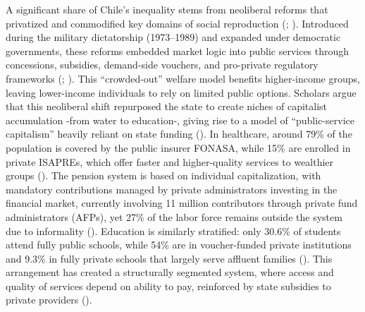 \documentclass[
  13pt,
]{article}
\begin{document}
A significant share of Chile's inequality stems from neoliberal reforms
that privatized and commodified key domains of social reproduction
(;
). Introduced during the
military dictatorship (1973--1989) and expanded under democratic
governments, these reforms embedded market logic into public services
through concessions, subsidies, demand-side vouchers, and pro-private
regulatory frameworks (;
). This
``crowded-out'' welfare model benefits higher-income groups, leaving
lower-income individuals to rely on limited public options. Scholars
argue that this neoliberal shift repurposed the state to create niches
of capitalist accumulation -from water to education-, giving rise to a
model of ``public-service capitalism'' heavily reliant on state funding
(). In healthcare, around
79\% of the population is covered by the public insurer FONASA, while
15\% are enrolled in private ISAPREs, which offer faster and
higher-quality services to wealthier groups
(). The pension
system is based on individual capitalization, with mandatory
contributions managed by private administrators investing in the
financial market, currently involving 11 million contributors through
private fund administrators (AFPs), yet 27\% of the labor force remains
outside the system due to informality
(). Education is similarly stratified: only 30.6\% of
students attend fully public schools, while 54\% are in voucher-funded
private institutions and 9.3\% in fully private schools that largely
serve affluent families
(). This arrangement has created a structurally segmented
system, where access and quality of services depend on ability to pay,
reinforced by state subsidies to private providers
().
\end{document}
